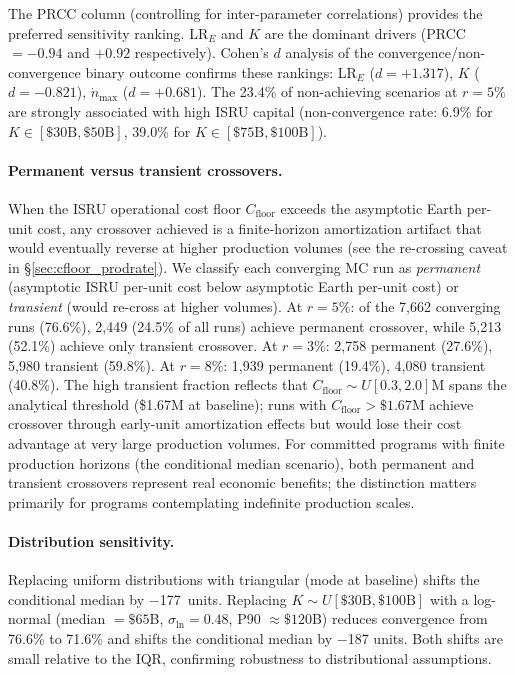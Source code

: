 \documentclass[preprint,12pt]{elsarticle}
\begin{document}
The PRCC column (controlling for inter-parameter correlations) provides the preferred sensitivity ranking. LR$_E$ and $K$ are the dominant drivers (PRCC $= -0.94$ and $+0.92$ respectively). Cohen's $d$ analysis of the convergence/non-convergence binary outcome confirms these rankings: LR$_E$ ($d = +1.317$), $K$ ($d = -0.821$), $\dot{n}_{\max}$ ($d = +0.681$). The 23.4\% of non-achieving scenarios at $r = 5\%$ are strongly associated with high ISRU capital (non-convergence rate: 6.9\% for $K \in [\$30\text{B}, \$50\text{B}]$, 39.0\% for $K \in [\$75\text{B}, \$100\text{B}]$).

\paragraph{Permanent versus transient crossovers.} When the ISRU operational cost floor $C_{\mathrm{floor}}$ exceeds the asymptotic Earth per-unit cost, any crossover achieved is a finite-horizon amortization artifact that would eventually reverse at higher production volumes (see the re-crossing caveat in \S\ref{sec:cfloor_prodrate}). We classify each converging MC run as \emph{permanent} (asymptotic ISRU per-unit cost below asymptotic Earth per-unit cost) or \emph{transient} (would re-cross at higher volumes). At $r = 5\%$: of the 7{,}662 converging runs (76.6\%), 2{,}449 (24.5\% of all runs) achieve permanent crossover, while 5{,}213 (52.1\%) achieve only transient crossover. At $r = 3\%$: 2{,}758 permanent (27.6\%), 5{,}980 transient (59.8\%). At $r = 8\%$: 1{,}939 permanent (19.4\%), 4{,}080 transient (40.8\%). The high transient fraction reflects that $C_{\mathrm{floor}} \sim U[0.3, 2.0]$M spans the analytical threshold (\$1.67M at baseline); runs with $C_{\mathrm{floor}} > \$1.67$M achieve crossover through early-unit amortization effects but would lose their cost advantage at very large production volumes. For committed programs with finite production horizons (the conditional median scenario), both permanent and transient crossovers represent real economic benefits; the distinction matters primarily for programs contemplating indefinite production scales.

\paragraph{Distribution sensitivity.} Replacing uniform distributions with triangular (mode at baseline) shifts the conditional median by $-$177~units. Replacing $K \sim U[\$30\text{B}, \$100\text{B}]$ with a log-normal (median $= \$65$B, $\sigma_{\ln} = 0.48$, P90 $\approx \$120$B) reduces convergence from 76.6\% to 71.6\% and shifts the conditional median by $-$187 units. Both shifts are small relative to the IQR, confirming robustness to distributional assumptions.
\end{document}
